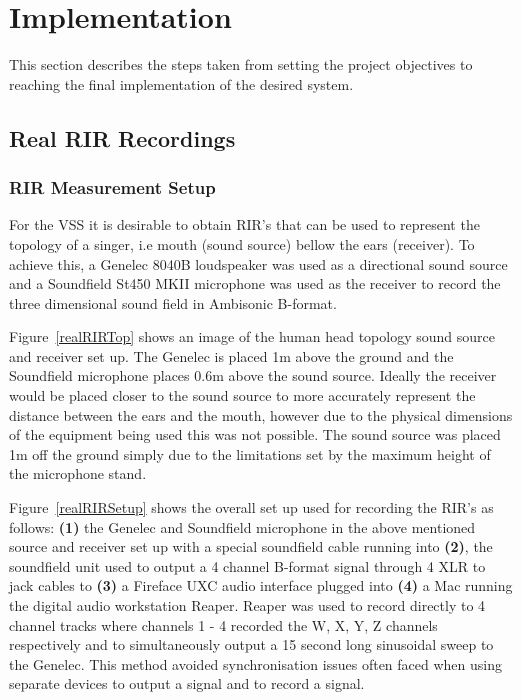 \documentclass[../../main.tex]{subfiles}
\begin{document}
\section{Implementation}
	This section describes the steps taken from setting the project objectives to reaching the final implementation of the desired system.


\subsection{Real RIR Recordings}
\label{realRIRs}
	
	\subsubsection{RIR Measurement Setup}

		For the \ac{VSS} it is desirable to obtain \ac{RIR}'s that can be used to represent the topology of a singer, i.e mouth (sound source) bellow the ears (receiver). To achieve this, a Genelec 8040B \cite{genelec} loudspeaker was used as a directional sound source and a Soundfield St450 MKII microphone \cite{st450} was used as the receiver to record the three dimensional sound field in Ambisonic B-format. 

		Figure~\ref{realRIRTop} shows an image of the human head topology sound source and receiver set up. The Genelec is placed 1m above the ground and the Soundfield microphone places 0.6m above the sound source. Ideally the receiver would be placed closer to the sound source to more accurately represent the distance between the ears and the mouth, however due to the physical dimensions of the equipment being used this was not possible. The sound source was placed 1m off the ground simply due to the limitations set by the maximum height of the microphone stand.

		Figure~\ref{realRIRSetup} shows the overall set up used for recording the \ac{RIR}'s as follows: \textbf{(1)} the Genelec and Soundfield microphone in the above mentioned source and receiver set up with a special soundfield cable running into \textbf{(2)}, the soundfield unit used to output a 4 channel B-format signal through 4 XLR to jack cables to \textbf{(3)} a Fireface UXC audio interface plugged into \textbf{(4)} a Mac running the digital audio workstation Reaper. Reaper was used to record directly to 4 channel tracks where channels 1 - 4 recorded the W, X, Y, Z channels respectively and to simultaneously output a 15 second long sinusoidal sweep to the Genelec. This method avoided synchronisation issues often faced when using separate devices to output a signal and to record a signal.
\end{document}
